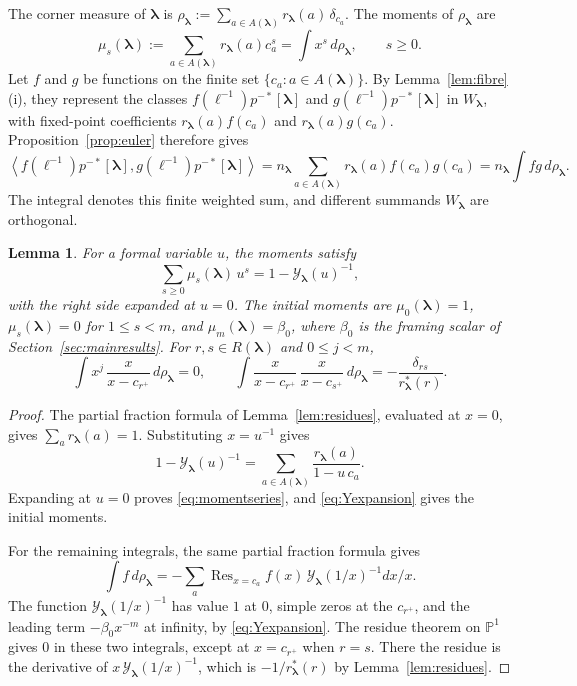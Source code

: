 \documentclass[11pt]{amsart}
\newtheorem{lemma}[theorem]{Lemma}
\theoremstyle{definition}
\theoremstyle{remark}
\newcommand{\betaz}{\beta_0}                     %
\newcommand{\bl}{{\boldsymbol{\lambda}}}         %
\newcommand{\Add}[1]{A(#1)}                      %
\newcommand{\Rem}[1]{R(#1)}                      %
\newcommand{\CY}{\mathcal Y}
\newcommand{\Yfn}[1]{\CY_{#1}}                   %
\newcommand{\res}[2]{r_{#1}(#2)}                 %
\newcommand{\cores}[2]{r^*_{#1}(#2)}             %
\newcommand{\cornermeas}[1]{\rho_{#1}}           %
\newcommand{\mom}[2]{\mu_{#1}(#2)}               %
\newcommand{\srcnorm}[1]{n_{#1}}                 %
\newcommand{\ip}[2]{\left\langle #1,#2\right\rangle}
\newcommand{\ceig}[1]{c_{#1}}                    %
\newcommand{\bplus}[1]{{#1}^{+}}                 %
\newcommand{\Wfib}[1]{W_{#1}}                    %
\newcommand{\fix}[1]{[#1]}                       %
\newcommand{\taut}{\ell}                         %
\newcommand{\pulm}{p^{-*}}                       %
\DeclareMathOperator{\Res}{Res}
\begin{document}
The corner measure of \(\bl\) is
\(\cornermeas{\bl}:=\sum_{a\in\Add{\bl}}\res{\bl}{a}\,\delta_{\ceig{a}}\).
The moments of \(\cornermeas{\bl}\) are
\begin{equation}\label{eq:cornermoments}
 \mom{s}{\bl}:=\sum_{a\in\Add{\bl}}\res{\bl}{a}\ceig{a}^{s}
 =\int x^s\,d\cornermeas{\bl},\qquad s\geq0.
\end{equation}
Let \(f\) and \(g\) be functions on the finite set
\(\{\ceig{a}:a\in\Add{\bl}\}\). By Lemma~\ref{lem:fibre}(i), they represent the
classes \(f(\taut^{-1})\pulm\fix{\bl}\) and \(g(\taut^{-1})\pulm\fix{\bl}\)
in \(\Wfib{\bl}\), with fixed-point coefficients
\(\res{\bl}{a}f(\ceig{a})\) and \(\res{\bl}{a}g(\ceig{a})\).
Proposition~\ref{prop:euler} therefore gives
\begin{equation}\label{eq:fibrepairing}
 \ip{f(\taut^{-1})\pulm\fix{\bl}}{g(\taut^{-1})\pulm\fix{\bl}}
 =\srcnorm{\bl}\sum_{a\in\Add{\bl}}\res{\bl}{a}f(\ceig{a})g(\ceig{a})
 =\srcnorm{\bl}\int fg\,d\cornermeas{\bl}.
\end{equation}
The integral denotes this finite weighted sum, and different summands
\(\Wfib{\bl}\) are orthogonal.

\begin{lemma}\label{lem:moments}
For a formal variable \(u\), the moments satisfy
\begin{equation}\label{eq:momentseries}
 \sum_{s\geq0}\mom{s}{\bl}\,u^s=1-\Yfn{\bl}(u)^{-1},
\end{equation}
with the right side expanded at \(u=0\).
The initial moments are \(\mom{0}{\bl}=1\), \(\mom{s}{\bl}=0\) for \(1\leq s<m\),
and \(\mom{m}{\bl}=\betaz\), where \(\betaz\) is the framing scalar of
Section~\ref{sec:mainresults}.
For \(r,s\in\Rem{\bl}\) and \(0\leq j<m\),
\[
 \int x^j\,\frac{x}{x-\ceig{\bplus{r}}}\,d\cornermeas{\bl}=0,\qquad
 \int\frac{x}{x-\ceig{\bplus{r}}}\,\frac{x}{x-\ceig{\bplus{s}}}\,d\cornermeas{\bl}
 =-\frac{\delta_{rs}}{\cores{\bl}{r}}.
\]
\end{lemma}

\begin{proof}
The partial fraction formula of Lemma~\ref{lem:residues}, evaluated at \(x=0\), gives
\(\sum_a\res{\bl}{a}=1\). Substituting \(x=u^{-1}\) gives
\[
 1-\Yfn{\bl}(u)^{-1}
 =\sum_{a\in\Add{\bl}}\frac{\res{\bl}{a}}{1-u\,\ceig{a}}.
\]
Expanding at \(u=0\) proves \eqref{eq:momentseries}, and
\eqref{eq:Yexpansion} gives the initial moments.

For the remaining integrals, the same partial fraction formula gives
\[
 \int f\,d\cornermeas{\bl}
 =-\sum_a\Res_{x=\ceig{a}}f(x)\,\Yfn{\bl}(1/x)^{-1}dx/x.
\]
The function
\(\Yfn{\bl}(1/x)^{-1}\) has value \(1\) at \(0\), simple zeros at the \(\ceig{\bplus{r}}\), and the
leading term \(-\betaz x^{-m}\) at infinity, by \eqref{eq:Yexpansion}. The
residue theorem on \(\mathbb P^1\) gives \(0\) in these two integrals,
except at \(x=\ceig{\bplus{r}}\) when \(r=s\). There the residue is the derivative of
\(x\,\Yfn{\bl}(1/x)^{-1}\), which is \(-1/\cores{\bl}{r}\) by Lemma~\ref{lem:residues}.
\end{proof}
\end{document}
